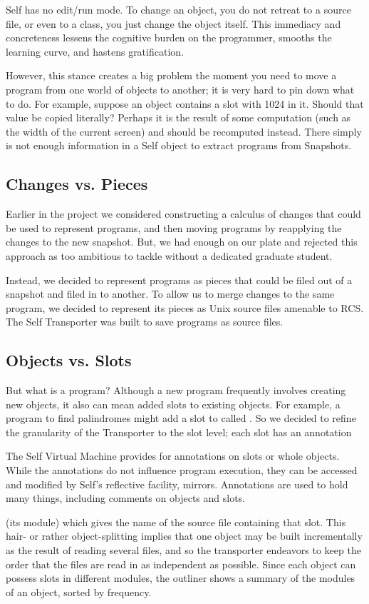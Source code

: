 \documentclass[letterpaper,10pt,english]{sphinxmanual}
\begin{document}
Self has no edit/run mode. To change an object, you do not retreat to a source file, or even to a class,
you just change the object itself. This immediacy and concreteness lessens the cognitive burden on
the programmer, smooths the learning curve, and hastens gratification.

However, this stance creates a big problem the moment you need to move a program from one
world of objects to another; it is very hard to pin down what to do. For example, suppose an object
contains a slot with 1024 in it. Should that value be copied literally? Perhaps it is the result of some
computation (such as the width of the current screen) and should be recomputed instead. There
simply is not enough information in a Self object to extract programs from Snapshots.


\subsection{Changes vs. Pieces}
\label{\detokenize{howtoprg:changes-vs-pieces}}
Earlier in the project we considered constructing a calculus of changes that could be used to represent
programs, and then moving programs by reapplying the changes to the new snapshot. But, we
had enough on our plate and rejected this approach as too ambitious to tackle without a dedicated
graduate student.

Instead, we decided to represent programs as pieces that could be filed out of a snapshot and filed
in to another. To allow us to merge changes to the same program, we decided to represent its pieces
as Unix source files amenable to RCS. The Self Transporter was built to save programs as source
files.


\subsection{Objects vs. Slots}
\label{\detokenize{howtoprg:objects-vs-slots}}
But what is a program? Although a new program frequently involves creating new objects, it also
can mean added slots to existing objects. For example, a program to find palindromes might add a
slot to  called . So we decided to refine the granularity of the
Transporter to the slot level; each slot has an annotation %
\begin{footnote}[8]\sphinxAtStartFootnote
The Self Virtual Machine provides for annotations on slots or whole objects. While the annotations do not influence program execution, they can be accessed and modified by Self’s reflective facility, mirrors. Annotations are used to hold many things, including comments on objects and slots.
%
\end{footnote} (its module) which gives the name of the
source file containing that slot. This hair- or rather object-splitting implies that one object may be
built incrementally as the result of reading several files, and so the transporter endeavors to keep
the order that the files are read in as independent as possible. Since each object can possess slots
in different modules, the outliner shows a summary of the modules of an object, sorted by frequency.
\end{document}
